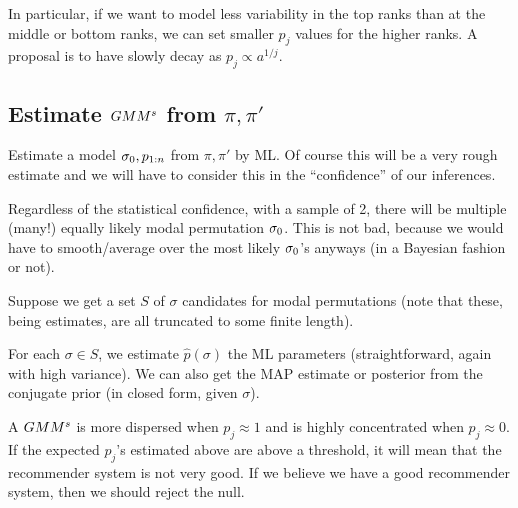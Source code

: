 \documentclass[10pt]{article}
\begin{document}
In particular, if we want to model less variability in the top ranks than at the middle or bottom ranks, we can set smaller $p_j$ values for the higher ranks. A proposal is to have slowly decay as $p_j\propto a^{1/j}$. %

\subsection{Estimate $GMM^s$ from $\pi,\pi'$}
\label{sec:gmm-sig0}
\benum
\item \label{it:est-sig0}  Estimate a model $\sigma_0,p_{1:n}$ from $\pi,\pi'$ by ML. Of course this will be a very rough estimate and we will have to consider this in the ``confidence'' of our inferences.

  Regardless of the statistical confidence, with a sample of 2, there will be multiple (many!) equally likely modal permutation $\sigma_0$. This is not bad, because we would have to smooth/average over the most likely $\sigma_0$'s anyways (in a Bayesian fashion or not).

Suppose we get a set $S$ of $\sigma$ candidates for modal permutations (note that these, being estimates, are all truncated to some finite length).

\item \label{it:est-thet} For each $\sigma\in S$, we estimate $\hat{p}(\sigma)$ the ML parameters (straightforward, again with high variance). We can also get the MAP estimate or posterior from the conjugate prior (in closed form, given $\sigma$).

\item \label{it:threshold} A $GMM^s$ is more dispersed when $p_j\approx 1$ and is highly concentrated when $p_j\approx 0$. If the expected $p_j$'s estimated above are above a threshold, it will mean that the recommender system is not very good. If we believe we have a good recommender system, then we should reject the null.  
\eenum

  
\end{document}
